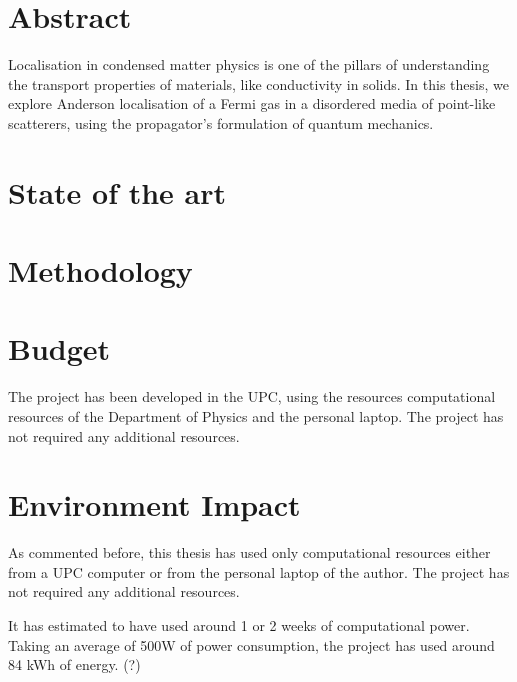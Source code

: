 \documentclass[a4paper,12pt]{article}
\begin{document}
\newpage


\clearpage
\newpage
\section*{Abstract}

{Localisation in condensed matter physics is one of the pillars of understanding the transport properties of materials, like conductivity in solids. In this thesis, we explore Anderson localisation of a Fermi gas in a disordered media of point-like scatterers, using the propagator's formulation of quantum mechanics.}



\clearpage\section{State of the art}

\clearpage\section{Methodology}





\clearpage
\section{Budget}

The project has been developed in the UPC, using the resources computational resources of the Department of Physics and the personal laptop. The project has not required any additional resources.

\clearpage

\section[Environment Impact]{{Environment Impact}}

As commented before, this thesis has used only computational resources either from a UPC computer or from the personal laptop of the author. The project has not required any additional resources.

It has estimated to have used around 1 or 2 weeks of computational power. Taking an average of 500W of power consumption, the project has used around 84 kWh of energy. (?)
\end{document}
